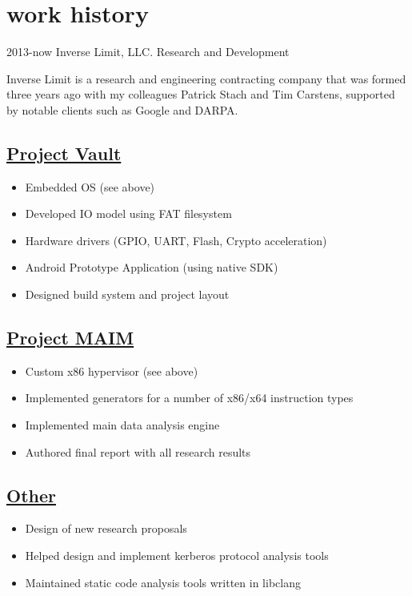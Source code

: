 \documentclass[]{friggeri-cv}
\newcommand{\heading}[1]{
  \vskip 0.05in
  \subsection{\uline{\small{#1}}}
  \vskip 0.05in
}
\begin{document}
\section{work history}

\begin{entrylist}
  \entry
    {2013-now}
    {Inverse Limit, LLC.}
    {Research and Development}
    {

      Inverse Limit is a research and engineering contracting company
      that was formed three years ago with my colleagues
      Patrick Stach and Tim Carstens, supported by notable clients
      such as Google and DARPA. 

      \heading{Project Vault}
      
      \begin{itemize}
      \item{Embedded OS (see above)}
      \item{Developed IO model using FAT filesystem}
      \item{Hardware drivers (GPIO, UART, Flash, Crypto acceleration)}
      \item{Android Prototype Application (using native SDK)}
      \item{Designed build system and project layout}
      \end{itemize}

      \heading{Project MAIM}
      
      \begin{itemize}
      \item{Custom x86 hypervisor (see above)}
      \item{Implemented generators for a number of x86/x64 instruction types}
      \item{Implemented main data analysis engine}
      \item{Authored final report with all research results}
      \end{itemize}

      \heading{Other}
      
      \begin{itemize}
      \item{Design of new research proposals}
      \item{Helped design and implement kerberos protocol analysis tools}
      \item{Maintained static code analysis tools written in libclang}
      \end{itemize}
      
}
\end{entrylist}
\end{document}
